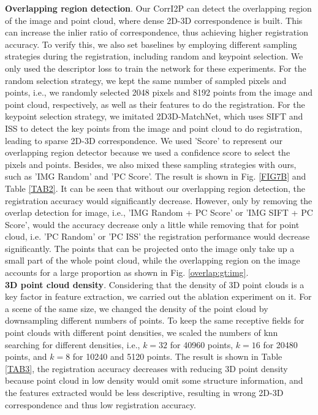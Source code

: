 \documentclass[lettersize,journal]{IEEEtran}
\begin{document}
\noindent\textbf{Overlapping region detection}.
Our CorrI2P can detect the overlapping region of the image and point cloud, where dense 2D-3D correspondence is built. This can increase the inlier ratio of correspondence, thus achieving higher registration accuracy. To verify this, we also set baselines by employing different sampling strategies during the registration, including random and keypoint selection. We only used the descriptor loss to train the network for these experiments. For the random selection strategy, we kept the same number of sampled pixels and points, i.e., we randomly selected 2048 pixels and 8192 points from the image and point cloud, respectively, as well as their features to do the registration. For the keypoint selection strategy,  we imitated 2D3D-MatchNet, which uses SIFT and ISS to detect the key points from the image and point cloud to do registration, leading to sparse 2D-3D correspondence. We used 'Score' to represent our overlapping region detector because we used a confidence score to select the pixels and points. Besides, we also mixed these sampling strategies with ours, such as 'IMG Random' and 'PC Score'. The result is shown in Fig. \ref{FIG7B} and Table \ref{TAB2}. It can be seen that without our overlapping region detection, the registration accuracy would significantly decrease. However, only by removing the overlap detection for image, i.e., 'IMG Random + PC Score' or 'IMG SIFT + PC Score', would the accuracy decrease only a little while removing that for point cloud, i.e. 'PC Random' or 'PC ISS' the registration performance would decrease significantly. The points that can be projected onto the image only take up a small part of the whole point cloud, while the overlapping region on the image accounts for a large proportion as shown in Fig. \ref{overlap:gt:img}. \\

\noindent\textbf{3D point cloud density}. Considering that the density of 3D point clouds is a key factor in feature extraction, we carried out the ablation experiment on it. For a scene of the same size, we changed the density of the point cloud by downsampling different numbers of points. To keep the same receptive fields for point clouds with different point densities, we scaled the numbers of knn searching for different densities, i.e., $k=32$ for 40960 points, $k=16$ for 20480 points, and $k=8$ for 10240 and 5120 points. The result is shown in Table \ref{TAB3}, the registration accuracy decreases with reducing 3D point density because point cloud in low density would omit some structure information, and the features extracted would be less descriptive, resulting in wrong 2D-3D correspondence and thus low registration accuracy.
\end{document}
